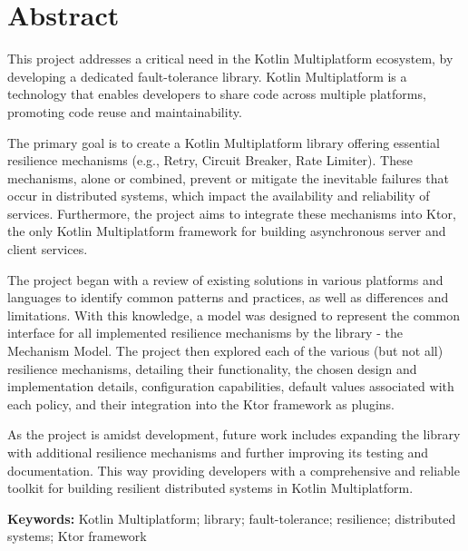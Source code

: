 \chapter*{Abstract}\label{ch:abstract}

This project addresses a critical need in the Kotlin Multiplatform ecosystem,
by developing a dedicated fault-tolerance library.
Kotlin Multiplatform is a technology that enables developers to share code across multiple platforms, promoting code reuse and maintainability.

The primary goal is
to create a Kotlin Multiplatform library
offering essential resilience mechanisms (e.g., Retry, Circuit Breaker, Rate Limiter).
These mechanisms, alone or combined, prevent or mitigate the inevitable failures that occur in distributed systems,
which impact the availability and reliability of services.
Furthermore, the project aims to integrate these mechanisms into Ktor,
the only Kotlin Multiplatform framework for building asynchronous server and client services.

The project began with a review of existing solutions in various platforms and languages to identify common patterns and practices, as well as differences and limitations.
With this knowledge,
a model was designed to represent the common interface for all implemented resilience mechanisms by the library -
the Mechanism Model.
The project then explored each of the
various (but not all) resilience mechanisms,
detailing their functionality,
the chosen design and implementation details, configuration capabilities, default values associated with each policy, and their integration into the Ktor framework as plugins.

As the project is amidst development, future work includes
expanding the library with additional resilience mechanisms
and further improving its testing and documentation.
This way providing developers with a comprehensive and reliable toolkit for building resilient distributed systems
in Kotlin Multiplatform.

\textbf{Keywords:} Kotlin Multiplatform; library; fault-tolerance; resilience; distributed systems; Ktor framework
